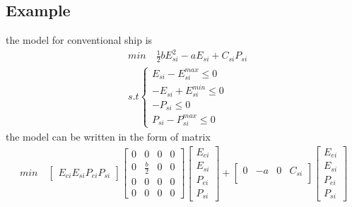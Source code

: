 \documentclass[11pt]{article} %
\begin{document}
\subsection{Example}
the model for conventional ship  is
\begin{align}  
    &min \quad \frac{1}{2}bE_{si}^2 -aE_{si} + C_{si}P_{si}  \nonumber\\
    &s.t \begin{cases}
        E_{si} - E_{si}^{max} \leq 0\\
         -E_{si} + E_{si}^{min}\leq 0\\
         -P_{si}\leq 0\\
          P_{si} - P_{si}^{max} \leq 0
        \end{cases}
\end{align}
the model can be written in the form of matrix
\begin{align} 
    min \quad
    \begin{bmatrix}
        E_{ei}
        E_{si}
        P_{ei}
        P_{si}
    \end{bmatrix} 
    \begin{bmatrix}
        0 & 0 & 0 & 0\\
        0 & \frac{b}{2}  & 0 & 0\\
        0 & 0 & 0 & 0\\
        0 & 0 & 0 & 0
    \end{bmatrix} 
    \begin{bmatrix}
        E_{ei}\\
        E_{si}\\
        P_{ei}\\
        P_{si}
    \end{bmatrix} +
    \begin{bmatrix}
        0 & -a & 0 & C_{si}\\
    \end{bmatrix} 
    \begin{bmatrix}
        E_{ei}\\
        E_{si}\\
        P_{ei}\\
        P_{si}
    \end{bmatrix}
\end{align}
\end{document}
